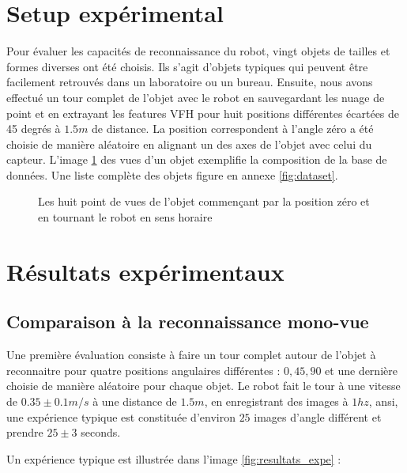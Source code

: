 \section{Setup expérimental}
Pour évaluer les capacités de reconnaissance du robot, vingt objets de tailles et formes diverses ont été choisis. Ils s'agit d'objets typiques qui peuvent être facilement retrouvés dans un laboratoire ou un bureau. Ensuite, nous avons effectué un tour complet de l'objet avec le robot en sauvegardant les nuage de point et en extrayant les features VFH pour huit positions différentes écartées de 45 degrés à $1.5 m$ de distance. La position correspondent à l'angle zéro a été choisie de manière aléatoire en alignant un des axes de l'objet avec celui du capteur. L'image \ref{fig:setup_expe} des vues d'un objet exemplifie la composition de la base de données. Une liste complète des objets figure en annexe \ref{fig:dataset}.

\begin{figure}[H]
	\caption{Les huit point de vues de l'objet commençant par la position zéro et en tournant le robot en sens horaire}
	\label{fig:setup_expe}
\end{figure}

\section{Résultats expérimentaux}
\subsection{Comparaison à la reconnaissance mono-vue}
Une première évaluation consiste à faire un tour complet autour de l'objet à reconnaitre pour quatre positions angulaires différentes : $0, 45, 90$ et une dernière choisie de manière aléatoire pour chaque objet. Le robot fait le tour à une vitesse de $0.35 \pm 0.1 m/s$ à une distance de $1.5m$, en enregistrant des images à $1hz$, ansi, une expérience typique est constituée d'environ $25$  images d'angle différent et prendre $25 \pm 3$ seconds. 

Un expérience typique est illustrée dans l'image \ref{fig:resultats_expe} :

